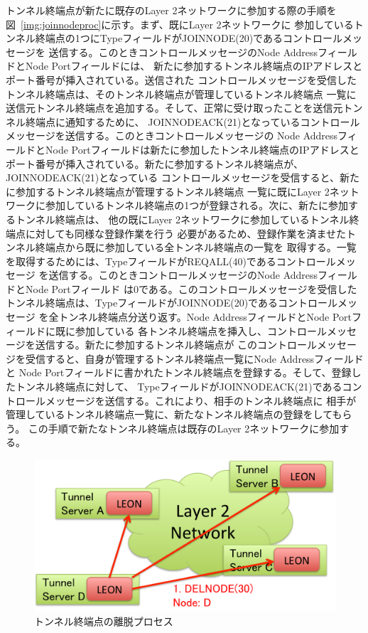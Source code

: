 トンネル終端点が新たに既存のLayer 2ネットワークに参加する際の手順を図~\ref{img:joinnodeproc}に示す。まず、既にLayer 2ネットワークに
参加しているトンネル終端点の1つにTypeフィールドがJOINNODE(20)であるコントロールメッセージを
送信する。このときコントロールメッセージのNode AddressフィールドとNode Portフィールドには、
新たに参加するトンネル終端点のIPアドレスとポート番号が挿入されている。送信された
コントロールメッセージを受信したトンネル終端点は、そのトンネル終端点が管理しているトンネル終端点
一覧に送信元トンネル終端点を追加する。そして、正常に受け取ったことを送信元トンネル終端点に通知するために、
JOINNODEACK(21)となっているコントロールメッセージを送信する。このときコントロールメッセージの
Node AddressフィールドとNode Portフィールドは新たに参加したトンネル終端点のIPアドレスと
ポート番号が挿入されている。新たに参加するトンネル終端点が、JOINNODEACK(21)となっている
コントロールメッセージを受信すると、新たに参加するトンネル終端点が管理するトンネル終端点
一覧に既にLayer 2ネットワークに参加しているトンネル終端点の1つが登録される。次に、新たに参加するトンネル終端点は、
他の既にLayer 2ネットワークに参加しているトンネル終端点に対しても同様な登録作業を行う
必要があるため、登録作業を済ませたトンネル終端点から既に参加している全トンネル終端点の一覧を
取得する。一覧を取得するためには、TypeフィールドがREQALL(40)であるコントロールメッセージ
を送信する。このときコントロールメッセージのNode AddressフィールドとNode Portフィールド
は0である。このコントロールメッセージを受信したトンネル終端点は、TypeフィールドがJOINNODE(20)であるコントロールメッセージ
を全トンネル終端点分送り返す。Node AddressフィールドとNode Portフィールドに既に参加している
各トンネル終端点を挿入し、コントロールメッセージを送信する。新たに参加するトンネル終端点が
このコントロールメッセージを受信すると、自身が管理するトンネル終端点一覧にNode Addressフィールドと
Node Portフィールドに書かれたトンネル終端点を登録する。そして、登録したトンネル終端点に対して、
TypeフィールドがJOINNODEACK(21)であるコントロールメッセージを送信する。これにより、相手のトンネル終端点に
相手が管理しているトンネル終端点一覧に、新たなトンネル終端点の登録をしてもらう。
この手順で新たなトンネル終端点は既存のLayer 2ネットワークに参加する。

\begin{figure}
	\begin{center}
		\includegraphics[scale=0.60]{./img/delnodeproc}
		\caption{トンネル終端点の離脱プロセス}
		\label{img:delnodeproc}
	\end{center}
\end{figure}

